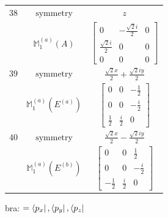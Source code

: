 \documentclass[fleqn,8pt,landscape]{jsarticle}
\begin{document}
\begin{longtable}{ccc}
$ 38 $ & $ \text{symmetry} $ & $ z $ \\
$  $ & $ \mathbb{M}_{1}^{(a)}(A) $ & $ \begin{bmatrix} 0 & - \frac{\sqrt{2} i}{2} & 0 \\ \frac{\sqrt{2} i}{2} & 0 & 0 \\ 0 & 0 & 0 \end{bmatrix} $ \\ \hline
$ 39 $ & $ \text{symmetry} $ & $ \frac{\sqrt{2} x}{2} + \frac{\sqrt{2} i y}{2} $ \\
$  $ & $ \mathbb{M}_{1}^{(a)}(E^{(a)}) $ & $ \begin{bmatrix} 0 & 0 & - \frac{1}{2} \\ 0 & 0 & - \frac{i}{2} \\ \frac{1}{2} & \frac{i}{2} & 0 \end{bmatrix} $ \\ \hline
$ 40 $ & $ \text{symmetry} $ & $ \frac{\sqrt{2} x}{2} - \frac{\sqrt{2} i y}{2} $ \\
$  $ & $ \mathbb{M}_{1}^{(a)}(E^{(b)}) $ & $ \begin{bmatrix} 0 & 0 & \frac{1}{2} \\ 0 & 0 & - \frac{i}{2} \\ - \frac{1}{2} & \frac{i}{2} & 0 \end{bmatrix} $ \\ \hline
\end{longtable}
bra: $=\bra{p_{x}}, \bra{p_{y}}, \bra{p_{z}}$
\end{document}
